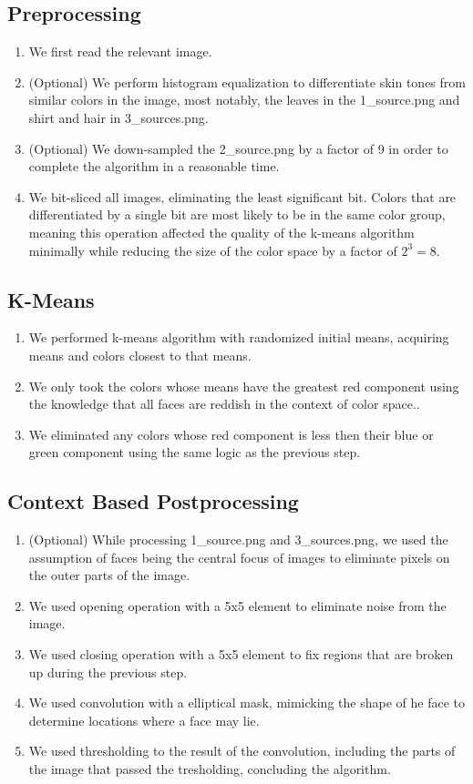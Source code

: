\documentclass[conference]{IEEEtran}
\begin{document}
\subsection{Preprocessing}
\begin{enumerate}
	\item We first read the relevant image.
	\item (Optional) We perform histogram equalization to differentiate skin tones from similar colors in the image, most notably, the leaves in the 1\_source.png and shirt and hair in 3\_sources.png. 
	\item (Optional) We down-sampled the 2\_source.png by a factor of 9 in order to complete the algorithm in a reasonable time. 
	\item We bit-sliced all images, eliminating the least significant bit. Colors that are differentiated by a single bit are most likely to be in the same color group, meaning this operation affected the quality of the k-means algorithm minimally while reducing the size of the color space by a factor of $2^3=8$.
\end{enumerate}
\subsection{K-Means}
\begin{enumerate}
	\item We performed k-means algorithm with randomized initial means, acquiring means and colors closest to that means.
	\item We only took the colors whose means have the greatest red component using the knowledge that all faces are reddish in the context of color space..
	\item We eliminated any colors whose red component is less then their blue or green component using the same logic as the previous step.
\end{enumerate}

\subsection{Context Based Postprocessing}
\begin{enumerate}
	\item (Optional) While processing 1\_source.png and 3\_sources.png, we used the assumption of faces being the central focus of images to eliminate pixels on the outer parts of the image.
	\item We used opening operation with a 5x5 element to eliminate noise from the image.
	\item We used closing operation with a 5x5 element to fix regions that are broken up during the previous step.
	\item We used convolution with a elliptical mask, mimicking the shape of he face to determine locations where a face may lie.
	\item We used thresholding to the result of the convolution, including the parts of the image that passed the tresholding, concluding the algorithm.
\end{enumerate}
\end{document}
